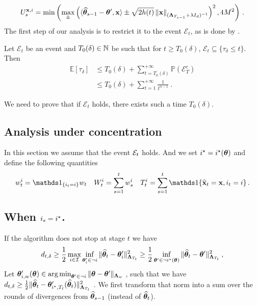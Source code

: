 \begin{equation}
\label{eq:def_ucb_br_general_nc}
U_s^{{\bf x},i} = \min\left(\max_\pm \left( \langle \widehat{{\boldsymbol \theta}}_{s-1} - {\boldsymbol \theta}',{\bf x}\rangle \pm \sqrt{2 h(t)} \left\lVert{\bf x}\right\rVert_{({\boldsymbol \Lambda}_{T_{s-1}}+ \lambda I_d)^{-1}} \right)^2,4M^2\right)\,.
\end{equation}
The first step of our analysis is to restrict it to the event $\mathcal E_t$, as is done by \citet{garivier2016tracknstop,degenne2019game}.
\begin{lemma}
Let $\mathcal E_t$ be an event and $T_0(\delta) \in {\mathbb N}$ be such that for $t\ge T_0(\delta)$, $\mathcal E_t \subseteq \{\tau_\delta \le t\}$. Then
\begin{align*}
\mathbb{E}[\tau_\delta]
&\le T_0(\delta) + \sum_{t=T_0(\delta)}^{+\infty} \mathbb{P}(\mathcal E_T^c)
\\
&\le T_0(\delta) + \sum_{t=1}^{+\infty} \frac{1}{t^{\alpha-1}}\: .
\end{align*}
\end{lemma}

We need to prove that if $\mathcal E_t$ holds, there exists such a time $T_0(\delta)$.

\subsection{Analysis under concentration}
In this section we assume that the event $\mathcal{E}_t$ holds. And we set $i^\star=i^\star({\boldsymbol \theta})$ and define the following quantities
\[
w_t^i = \ind_{\{i_t = i\}}w_t \quad W_t^i = \sum_{s=1}^t w_s^i\quad T_t^i = \sum_{s=1}^t \ind{\{\hbx_t=\bx,i_t=i\}}\,.
\]

\subsection{When $i_s = i^\star$.}
If the algorithm does not stop at stage $t$
we have
\begin{align*}
d_{t,\delta}
\ge \frac{1}{2}\max_{i\in\mathcal{I}} \inf_{{\boldsymbol \theta}'_i \in \neg i}\Vert \widehat{{\boldsymbol \theta}}_t - {\boldsymbol \theta}'_i \Vert_{{\boldsymbol \Lambda}_{T_t}}^2
\geq  \frac{1}{2} \inf_{{\boldsymbol \theta}' \in \neg i^\star({\boldsymbol \theta})}\Vert \widehat{{\boldsymbol \theta}}_t - {\boldsymbol \theta}' \Vert_{{\boldsymbol \Lambda}_{T_t}}^2
\: ,
\end{align*}
Let ${\boldsymbol \theta}'_{i,w}({\boldsymbol \theta}) \in \operatorname*{arg\,min}_{{\boldsymbol \theta}' \in \neg i} \Vert {\boldsymbol \theta} - {\boldsymbol \theta}' \Vert_{{\boldsymbol \Lambda}_{w}}$ , such that we have $d_{t,\delta} \ge \frac{1}{2}\Vert \widehat{{\boldsymbol \theta}}_t - {\boldsymbol \theta}'_{i^\star,T_t}(\widehat{{\boldsymbol \theta}}_t) \Vert_{{\boldsymbol \Lambda}_{T_t}}^2$ . We first transform that norm into a sum over the rounds of divergences from $\widehat{{\boldsymbol \theta}}_{s-1}$ (instead of $\widehat{{\boldsymbol \theta}}_t$).

